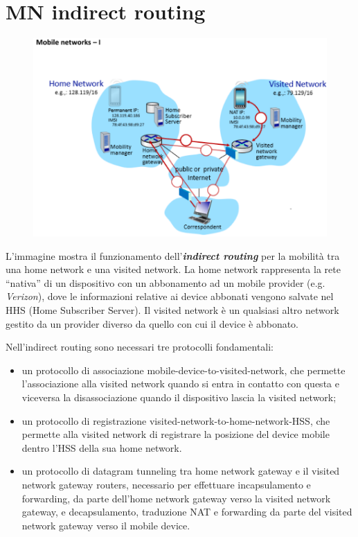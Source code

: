 \section{MN indirect routing}

\begin{figure}[htbp]
   \centering
   \includegraphics{images/questions/Schermata del 2023-11-01 16-14-28.png}
   \label{fig:dom2.4}
\end{figure}

L'immagine mostra il funzionamento dell'\textbf{\emph{indirect routing}} per la mobilità tra una home network e una visited network. La home network rappresenta la rete ``nativa'' di un dispositivo con un abbonamento ad un mobile provider (e.g. \textit{Verizon}), dove le informazioni relative ai device abbonati vengono salvate nel HHS (Home Subscriber Server). Il visited network è un qualsiasi altro network gestito da un provider diverso da quello con cui il device è abbonato.

Nell'indirect routing sono necessari tre protocolli fondamentali:
\begin{itemize}
\item un protocollo di associazione mobile-device-to-visited-network, che permette l'associazione alla visited network quando si entra in contatto con questa e viceversa la disassociazione quando il dispositivo lascia la visited network;
\item un protocollo di registrazione visited-network-to-home-network-HSS, che permette alla visited network di registrare la posizione del device mobile dentro l'HSS della sua home network.
\item un protocollo di datagram tunneling tra home network gateway e il visited network gateway routers, necessario per effettuare incapsulamento e forwarding, da parte dell'home network gateway verso la visited network gateway, e decapsulamento, traduzione NAT e forwarding  da parte del visited network gateway verso il mobile device.
\end{itemize}

